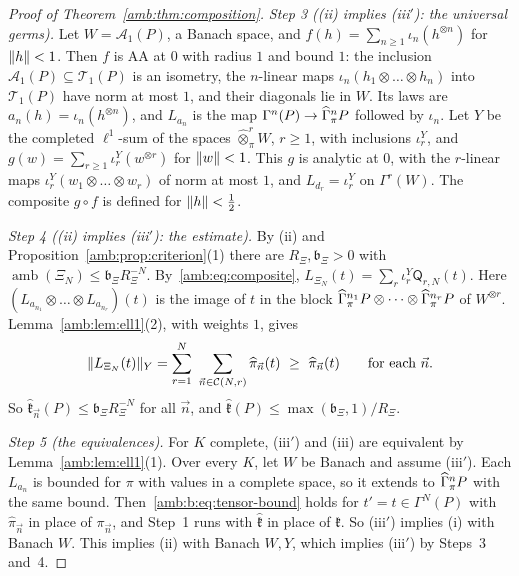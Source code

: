 \begin{proof}[Proof of Theorem~\ref{amb:thm:composition}]
\emph{Step 3 ((ii) implies (iii$'$): the universal germs).} Let $W=\mathcal A_1(P)$, a Banach space, and $f(h)=\sum_{n\ge1}\iota_n(h^{\otimes n})$ for $\lVert h\rVert<1$. Then $f$ is AA at $0$ with radius $1$ and bound $1$: the inclusion $\mathcal A_1(P)\subseteq\mathcal T_1(P)$ is an isometry, the $n$-linear maps $\iota_n(h_1\otimes\dots\otimes h_n)$ into $\mathcal T_1(P)$ have norm at most $1$, and their diagonals lie in $W$. Its laws are $a_n(h)=\iota_n(h^{\otimes n})$, and $L_{a_n}$ is the map $\Gamma^n(P)\to\widehat\Gamma^n_\pi P$ followed by $\iota_n$. Let $Y$ be the completed $\ell^1$-sum of the spaces $\widehat\otimes^r_\pi W$, $r\ge1$, with inclusions $\iota^Y_r$, and $g(w)=\sum_{r\ge1}\iota^Y_r(w^{\otimes r})$ for $\lVert w\rVert<1$. This $g$ is analytic at $0$, with the $r$-linear maps $\iota^Y_r(w_1\otimes\dots\otimes w_r)$ of norm at most $1$, and $L_{d_r}=\iota^Y_r$ on $\Gamma^r(W)$. The composite $g\circ f$ is defined for $\lVert h\rVert<\frac12$.

\emph{Step 4 ((ii) implies (iii$'$): the estimate).} By (ii) and Proposition~\ref{amb:prop:criterion}(1) there are $R_\Xi,\mathfrak b_\Xi>0$ with $\operatorname{amb}(\Xi_N)\le \mathfrak b_\Xi R_\Xi^{-N}$. By~\eqref{amb:eq:composite}, $L_{\Xi_N}(t)=\sum_r\iota^Y_r\mathsf Q_{r,N}(t)$. Here $(L_{a_{n_1}}\otimes\dots\otimes L_{a_{n_r}})(t)$ is the image of $t$ in the block $\widehat\Gamma^{n_1}_\pi P\otimes\dots\otimes\widehat\Gamma^{n_r}_\pi P$ of $W^{\otimes r}$. Lemma~\ref{amb:lem:ell1}(2), with weights $1$, gives
\[
 \norm{L_{\Xi_N}(t)}_Y=\sum_{r=1}^N\ \sum_{\vec n\in\mathcal C(N,r)}\widehat\pi_{\vec n}(t)\ \ge\ \widehat\pi_{\vec n}(t)\qquad\text{for each }\vec n.
\]
So $\widehat{\mathfrak k}_{\vec n}(P)\le \mathfrak b_\Xi R_\Xi^{-N}$ for all $\vec n$, and $\widehat{\mathfrak k}(P)\le\max(\mathfrak b_\Xi,1)/R_\Xi$.

\emph{Step 5 (the equivalences).} For $K$ complete, (iii$'$) and (iii) are equivalent by Lemma~\ref{amb:lem:ell1}(1). Over every $K$, let $W$ be Banach and assume (iii$'$). Each $L_{a_n}$ is bounded for $\pi$ with values in a complete space, so it extends to $\widehat\Gamma^n_\pi P$ with the same bound. Then~\eqref{amb:b:eq:tensor-bound} holds for $t'=t\in\Gamma^N(P)$ with $\widehat\pi_{\vec n}$ in place of $\pi_{\vec n}$, and Step~1 runs with $\widehat{\mathfrak k}$ in place of $\mathfrak k$. So (iii$'$) implies (i) with Banach $W$. This implies (ii) with Banach $W,Y$, which implies (iii$'$) by Steps~3 and~4.


\end{proof}
